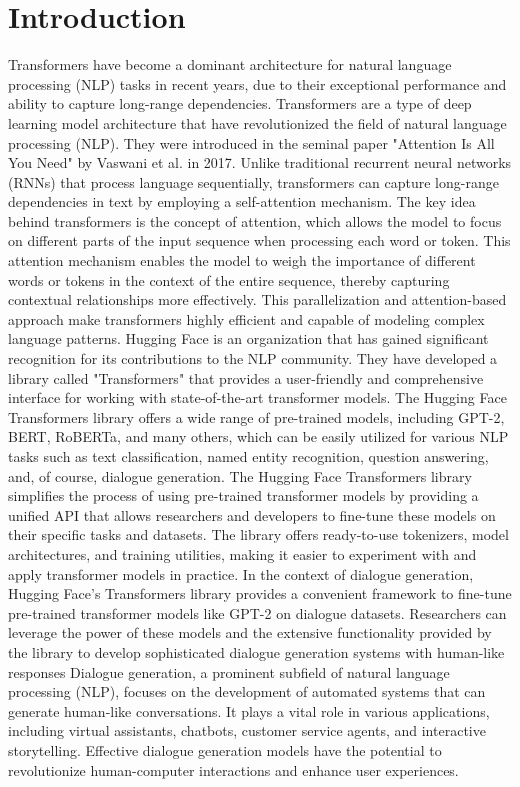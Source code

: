 \documentclass[12pt]{IEEEtran}
\begin{document}
\section{Introduction}\label{sectionintro}
Transformers have become a dominant architecture for natural language processing (NLP) tasks in recent years, due to their exceptional performance and ability to capture long-range dependencies. Transformers are a type of deep learning model architecture that have revolutionized the field of natural language processing (NLP). They were introduced in the seminal paper "Attention Is All You Need" by Vaswani et al. \cite{attention} in 2017. Unlike traditional recurrent neural networks (RNNs) that process language sequentially, transformers can capture long-range dependencies in text by employing a self-attention mechanism. The key idea behind transformers is the concept of attention, which allows the model to focus on different parts of the input sequence when processing each word or token. This attention mechanism enables the model to weigh the importance of different words or tokens in the context of the entire sequence, thereby capturing contextual relationships more effectively. This parallelization and attention-based approach make transformers highly efficient and capable of modeling complex language patterns.
Hugging Face is an organization that has gained significant recognition for its contributions to the NLP community. They have developed a library called "Transformers" that provides a user-friendly and comprehensive interface for working with state-of-the-art transformer models. The Hugging Face Transformers library offers a wide range of pre-trained models, including GPT-2, BERT, RoBERTa, and many others, which can be easily utilized for various NLP tasks such as text classification, named entity recognition, question answering, and, of course, dialogue generation.
The Hugging Face Transformers library simplifies the process of using pre-trained transformer models by providing a unified API that allows researchers and developers to fine-tune these models on their specific tasks and datasets. The library offers ready-to-use tokenizers, model architectures, and training utilities, making it easier to experiment with and apply transformer models in practice. In the context of dialogue generation, Hugging Face's Transformers library provides a convenient framework to fine-tune pre-trained transformer models like GPT-2 on dialogue datasets. Researchers can leverage the power of these models and the extensive functionality provided by the library to develop sophisticated dialogue generation systems with human-like responses
Dialogue generation, a prominent subfield of natural language processing (NLP), focuses on the development of automated systems that can generate human-like conversations. It plays a vital role in various applications, including virtual assistants, chatbots, customer service agents, and interactive storytelling. Effective dialogue generation models have the potential to revolutionize human-computer interactions and enhance user experiences.
\end{document}

